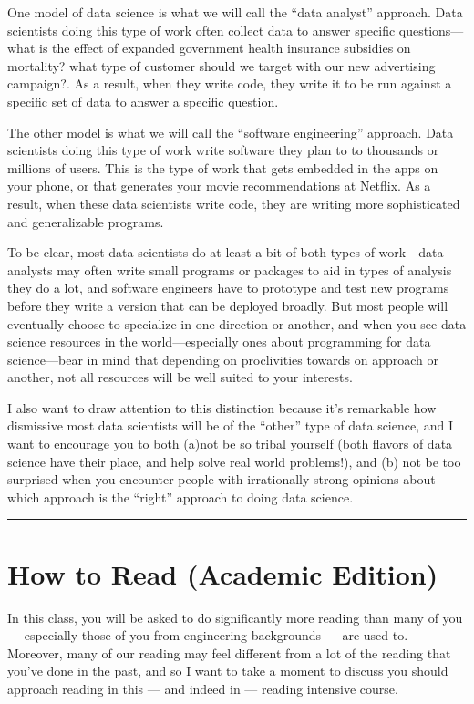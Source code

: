 \documentclass[letterpaper,10pt,english]{jupyterBook}
\begin{document}
\sphinxAtStartPar
One model of data science is what we will call the “data analyst” approach. Data scientists doing this type of work often collect data to answer specific questions—what is the effect of expanded government health insurance subsidies on mortality? what type of customer should we target with our new advertising campaign?. As a result, when they write code, they write it to be run against a specific set of data to answer a specific question.

\sphinxAtStartPar
The other model is what we will call the “software engineering” approach. Data scientists doing this type of work write software they plan to  to thousands or millions of users. This is the type of work that gets embedded in the apps on your phone, or that generates your movie recommendations at Netflix. As a result, when these data scientists write code, they are writing more sophisticated and generalizable programs.

\sphinxAtStartPar
To be clear, most data scientists do at least a bit of both types of work—data analysts may often write small programs or packages to aid in types of analysis they do a lot, and software engineers have to prototype and test new programs before they write a version that can be deployed broadly. But most people will eventually choose to specialize in one direction or another, and when you see data science resources in the world—especially ones about programming for data science—bear in mind that depending on  proclivities towards on approach or another, not all resources will be well suited to your interests.

\sphinxAtStartPar
I also want to draw attention to this distinction because it’s remarkable how dismissive most data scientists will be of the “other” type of data science, and I want to encourage you to both (a)not be so tribal yourself (both flavors of data science have their place, and help solve real world problems!), and (b) not be too surprised when you encounter people with irrationally strong opinions about which approach is the “right” approach to doing data science.


\bigskip\hrule\bigskip


\sphinxstepscope


\chapter{How to Read (Academic Edition)}
\label{\detokenize{40_in_practice/00_how_to_read_this_book:how-to-read-academic-edition}}\label{\detokenize{40_in_practice/00_how_to_read_this_book::doc}}
\sphinxAtStartPar
In this class, you will be asked to do significantly more reading than many of you — especially those of you from engineering backgrounds — are used to. Moreover, many of our reading may feel different from a lot of the reading that you’ve done in the past, and so I want to take a moment to discuss  you should approach reading in this — and indeed in  — reading intensive course.
\end{document}
